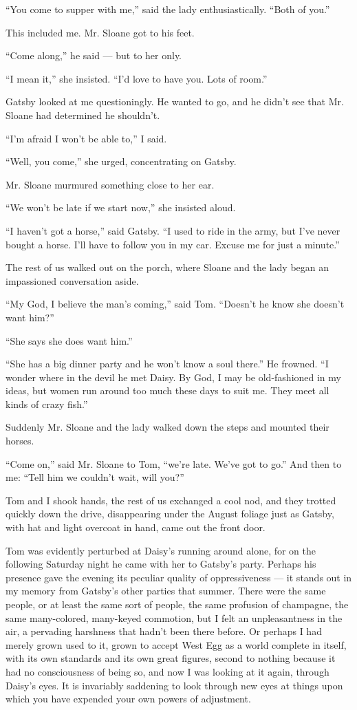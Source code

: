 \documentclass{znotebook}
\begin{document}
``You come to supper with me,'' said the lady enthusiastically. ``Both of you.''

This included me. Mr. Sloane got to his feet.

``Come along,'' he said ---{} but to her only.

``I mean it,'' she insisted. ``I'd love to have you. Lots of room.''

Gatsby looked at me questioningly. He wanted to go, and he didn't see that Mr. Sloane had determined he shouldn't.

``I'm afraid I won't be able to,'' I said.

``Well, you come,'' she urged, concentrating on Gatsby.

Mr. Sloane murmured something close to her ear.

``We won't be late if we start now,'' she insisted aloud.

``I haven't got a horse,'' said Gatsby. ``I used to ride in the army, but I've never bought a horse. I'll have to follow you in my car. Excuse me for just a minute.''

The rest of us walked out on the porch, where Sloane and the lady began an impassioned conversation aside.

``My God, I believe the man's coming,'' said Tom. ``Doesn't he know she doesn't want him?''

``She says she does want him.''

``She has a big dinner party and he won't know a soul there.'' He frowned. ``I wonder where in the devil he met Daisy. By God, I may be old-fashioned in my ideas, but women run around too much these days to suit me. They meet all kinds of crazy fish.''

Suddenly Mr. Sloane and the lady walked down the steps and mounted their horses.

``Come on,'' said Mr. Sloane to Tom, ``we're late. We've got to go.'' And then to me: ``Tell him we couldn't wait, will you?''

Tom and I shook hands, the rest of us exchanged a cool nod, and they trotted quickly down the drive, disappearing under the August foliage just as Gatsby, with hat and light overcoat in hand, came out the front door.

Tom was evidently perturbed at Daisy's running around alone, for on the following Saturday night he came with her to Gatsby's party. Perhaps his presence gave the evening its peculiar quality of oppressiveness ---{} it stands out in my memory from Gatsby's other parties that summer. There were the same people, or at least the same sort of people, the same profusion of champagne, the same many-colored, many-keyed commotion, but I felt an unpleasantness in the air, a pervading harshness that hadn't been there before. Or perhaps I had merely grown used to it, grown to accept West Egg as a world complete in itself, with its own standards and its own great figures, second to nothing because it had no consciousness of being so, and now I was looking at it again, through Daisy's eyes. It is invariably saddening to look through new eyes at things upon which you have expended your own powers of adjustment.
\end{document}
